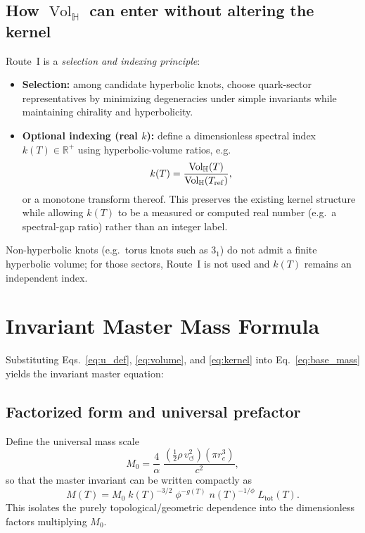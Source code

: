 \documentclass[11pt,a4paper]{article}
\newcommand{\Vol}{\operatorname{Vol}}
\begin{document}
    \subsection{How $\Vol_{\mathbb H}$ can enter without altering the kernel}
    Route~I is a \emph{selection and indexing principle}:
    \begin{itemize}
        \item \textbf{Selection:} among candidate hyperbolic knots, choose quark-sector
        representatives by minimizing degeneracies under simple invariants while maintaining
        chirality and hyperbolicity.
        \item \textbf{Optional indexing (real $k$):} define a dimensionless spectral index
        $k(T)\in\mathbb{R}^+$ using hyperbolic-volume ratios, e.g.
        \[
            k(T)=\frac{\Vol_{\mathbb H}(T)}{\Vol_{\mathbb H}(T_{\rm ref})},
        \]
        or a monotone transform thereof.
        This preserves the existing kernel structure while allowing $k(T)$ to be a measured
        or computed real number (e.g.\ a spectral-gap ratio) rather than an integer label.
    \end{itemize}
    Non-hyperbolic knots (e.g.\ torus knots such as $3_1$) do not admit a finite hyperbolic
    volume; for those sectors, Route~I is not used and $k(T)$ remains an independent index.


    \section{Invariant Master Mass Formula}

        Substituting
        Eqs.~\eqref{eq:u_def}, \eqref{eq:volume}, and \eqref{eq:kernel}
        into Eq.~\eqref{eq:base_mass} yields the invariant master equation:

        \subsection*{Factorized form and universal prefactor}
        Define the universal mass scale
        \begin{equation}
            M_0
            =
            \frac{4}{\alpha}\;
            \frac{\left(\frac12\rho\,v_{\circlearrowleft}^2\right)\left(\pi r_c^3\right)}{c^2},
            \label{eq:M0_def}
        \end{equation}
        so that the master invariant can be written compactly as
        \begin{equation}
            M(T)=
            M_0\;
            k(T)^{-3/2}\;
            \phi^{-g(T)}\;
            n(T)^{-1/\phi}\;
            L_{\mathrm{tot}}(T).
            \label{eq:master_factorized}
        \end{equation}
        This isolates the purely topological/geometric dependence into the dimensionless
        factors multiplying $M_0$.
\end{document}
